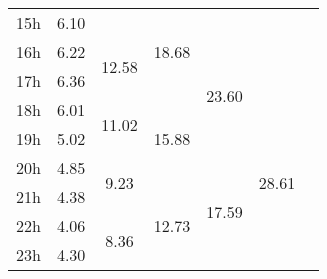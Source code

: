 \begin{center}
\begin{tabular}{ l || c | c | c | c | c | c }
 15h  &  \multirow{1}{*}{ 6.10 }   &   &  \multirow{3}{*}{ 18.68 }   &   &   &  \\\cline{2-2}\cline{3-3}\cline{5-5} 
 16h  &  \multirow{1}{*}{ 6.22 }   &  \multirow{2}{*}{ 12.58 }   &   &  \multirow{4}{*}{ 23.60 }   &   &  \\\cline{2-2} 
 17h  &  \multirow{1}{*}{ 6.36 }   &   &   &   &   &  \\\cline{2-2}\cline{3-3}\cline{4-4}\cline{6-6} 
 18h  &  \multirow{1}{*}{ 6.01 }   &  \multirow{2}{*}{ 11.02 }   &  \multirow{3}{*}{ 15.88 }   &   &  \multirow{6}{*}{ 28.61 }   &  \\\cline{2-2} 
 19h  &  \multirow{1}{*}{ 5.02 }   &   &   &   &   &  \\\cline{2-2}\cline{3-3}\cline{5-5} 
 20h  &  \multirow{1}{*}{ 4.85 }   &  \multirow{2}{*}{ 9.23 }   &   &  \multirow{4}{*}{ 17.59 }   &   &  \\\cline{2-2}\cline{4-4} 
 21h  &  \multirow{1}{*}{ 4.38 }   &   &  \multirow{3}{*}{ 12.73 }   &   &   &  \\\cline{2-2}\cline{3-3} 
 22h  &  \multirow{1}{*}{ 4.06 }   &  \multirow{2}{*}{ 8.36 }   &   &   &   &  \\\cline{2-2} 
 23h & \multirow{1}{*}{ 4.30 }  & & & & & \\\cline{2-2}\cline{3-3}\cline{4-4}\cline{5-5}\cline{6-6}\cline{7-7} 
 \hline\end{tabular} 
 \end{center}
